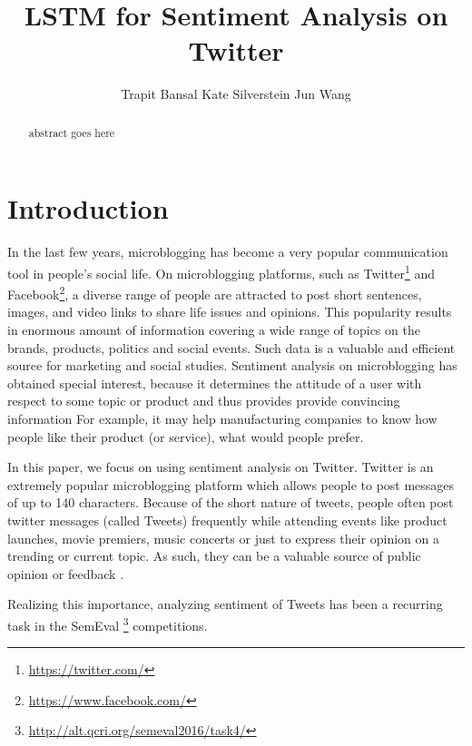 \documentclass{article} %
\title{LSTM for Sentiment Analysis on Twitter}
\author{
Trapit Bansal
\And
Kate Silverstein
\And
Jun Wang
}
\begin{document}
\maketitle

\begin{abstract}
abstract goes here
\end{abstract}

\section{Introduction}
In the last few years, microblogging has become a very popular communication tool in people's social life.
On microblogging platforms, such as Twitter\footnote{\url{https://twitter.com/}} and Facebook\footnote{\url{https://www.facebook.com/}}, a diverse range of people are attracted to post short sentences, images, and video links to share life issues and opinions.
This popularity results in enormous amount of information covering a wide range of topics on the brands, products, politics and social events. 
Such data is a valuable and efficient source for marketing and social studies. 
Sentiment analysis on microblogging has obtained special interest, because it determines the attitude of a user with respect to some topic or product and thus provides provide convincing information
For example, it may help manufacturing companies to know how people like their product (or service), what would people prefer.  

In this paper, we focus on using sentiment analysis on Twitter. 
Twitter is an extremely popular microblogging platform which allows people to post messages of up to 140 characters.
Because of the short nature of tweets, people often post twitter messages (called Tweets) frequently while attending events like product launches, movie premiers, music concerts or just to express their opinion on a trending or current topic.
As such, they can be a valuable source of public opinion or feedback \cite{o2010tweets, bollen2011twitter, bollen2009modeling}.

Realizing this importance, analyzing sentiment of Tweets has been a recurring task in the SemEval \footnote{\url{http://alt.qcri.org/semeval2016/task4/}} competitions.

\end{document}
